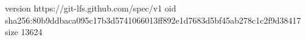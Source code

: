 version https://git-lfs.github.com/spec/v1
oid sha256:80b9ddbaca095c17b3d5741066013ff892e1d7683d5bf45ab278c1c2f9d38417
size 13624
